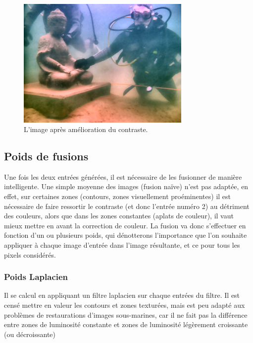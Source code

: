 \documentclass[twoside]{article}
\begin{document}
\begin{figure}[]
  \centering
  \includegraphics[width=0.75\textwidth]{Support/contrast.png}
  \caption{L'image après amélioration du contraste.}
\end{figure}

\subsection{Poids de fusions}
Une fois les deux entrées générées, il est nécessaire de les fusionner de manière intelligente. Une simple moyenne des images (fusion naïve) n'est pas adaptée, en effet, sur certaines zones (contours, zones visuellement proéminentes) il est nécessaire de faire ressortir le contraste (et donc l'entrée numéro 2) au détriment des couleurs, alors que dans les zones constantes (aplats de couleur), il vaut mieux mettre en avant la correction de couleur. La fusion va donc s'effectuer en fonction d'un ou plusieurs poids, qui dénotterons l'importance que l'on souhaite appliquer à chaque image d'entrée dans l'image résultante, et ce pour tous les pixels considérés. 

\subsubsection{Poids Laplacien}

Il se calcul en appliquant un filtre laplacien sur chaque entrées du filtre. Il est censé mettre en valeur les contours et zones texturées, mais est peu adapté aux problèmes de restaurations d'images sous-marines, car il ne fait pas la différence entre zones de luminosité constante et zones de luminosité légèrement croissante (ou décroissante)
\end{document}
